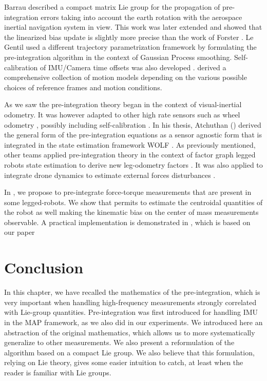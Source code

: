 Barrau \cite{barrau2020mathematical} described a compact matrix Lie group for the propagation of pre-integration errors taking into account the earth rotation with the aerospace
inertial navigation system in view. This work was later extended \cite{brossard2021associating} and showed that the linearized bias update is slightly more precise than 
the work of Forster \cite{forster2017-TRO}. Le Gentil \cite{le2020gaussian} used a different trajectory parametrization framework by formulating the pre-integration algorithm 
in the context of Gaussian Process smoothing. Self-calibration of IMU/Camera time offsets was also developed \cite{yang2020analytic}. 
\cite{luo2021unified} derived a comprehensive collection of motion models depending on the various possible choices of reference frames and motion conditions. 

As we saw the pre-integration theory began in the context of visual-inertial odometry. It was however adapted to other high rate sensors such as wheel odometry \cite{quan2019tightly}, 
possibly including self-calibration \cite{deray-19-selfcalib}. In his thesis, Atchuthan (\cite[Section 4.3]{atchuthan-18-thesis}) derived the general form of the pre-integration 
equations as a sensor agnostic form that is integrated in the state estimation framework WOLF \cite{sola2021wolf}. As previously mentioned, other teams applied pre-integration theory in the 
context of factor graph legged robots state estimation to derive new leg-odometry factors \cite{hartley2018legged, wisth2019robust, wisth2020preintegrated}.
It was also applied to integrate drone dynamics to estimate external forces disturbances \cite{nisar2019vimo}.

In , we propose to pre-integrate force-torque measurements that are present in some legged-robots. 
We show that permits to estimate the centroidal quantities of the robot as well making the kinematic bias on the center of mass measurements observable. 
A practical implementation is demonstrated in , which is based on our paper \cite{fourmy2021contact}



\section{Conclusion}

In this chapter, we have recalled the mathematics of the pre-integration,
which is very important when handling high-frequency measurements strongly
correlated with Lie-group quantities. Pre-integration was first introduced for
handling IMU in the MAP framework, as we also did in our experiments. We
introduced here an abstraction of the original mathematics, which allows us to more systematically generalize
to other measurements. We also present a reformulation of the algorithm based on a compact Lie group.
We also believe that this formulation, relying on
Lie theory, gives some easier intuition to catch, at least when the reader is
familiar with Lie groups.


